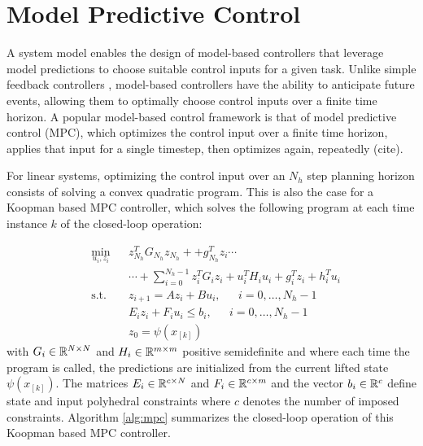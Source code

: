\section{Model Predictive Control}
\label{sec:mpc}

A system model enables the design of model-based controllers that leverage model predictions to choose suitable control inputs for a given task.
Unlike simple feedback controllers , model-based controllers have the ability to anticipate future events, allowing them to optimally choose control inputs over a finite time horizon.
A popular model-based control framework is that of model predictive control (MPC), which optimizes the control input over a finite time horizon, applies that input for a single timestep, then optimizes again, repeatedly (cite).

For linear systems, optimizing the control input over an $N_h$ step planning horizon consists of solving a convex quadratic program.
This is also the case for a Koopman based MPC controller, which solves the following program at each time instance $k$ of the closed-loop operation:

\begin{equation}
\begin{aligned}
& \underset{u_{i} , z_{i}}{\text{min}}
& & z_{N_h}^{T} G_{N_h} z_{N_h} + + g_{N_h}^T z_i \cdots \\
&&& \cdots + \sum_{i=0}^{N_h - 1} z_i^T G_i z_i + u_i^T H_i u_i + g_i^T z_i + h_i^T u_i\\
& \text{s.t.}
& & z_{i+1} = A z_i + B u_i , \; \hspace{15pt} i = 0 , \ldots , N_h - 1 \\
&&& E_i z_i + F_i u_i \leq b_i , \; \hspace{15pt} i = 0 , \ldots , N_h - 1 \\
&&& z_0 = \psi (x_{[k]})
\end{aligned} \label{eq:mpc}
\end{equation}
with $G_i \in \mathbb{R}^{N \times N}$ and $H_i \in \mathbb{R}^{m \times m}$ positive semidefinite and where each time the program is called, the predictions are initialized from the current lifted state $\psi (x_{[k]})$.
The matrices $E_i \in \mathbb{R}^{c \times N}$ and $F_i \in \mathbb{R}^{c \times m}$ and the vector $b_i \in \mathbb{R}^{c}$ define state and input polyhedral constraints where $c$ denotes the number of imposed constraints.
Algorithm \ref{alg:mpc} summarizes the closed-loop operation of this Koopman based MPC controller.

